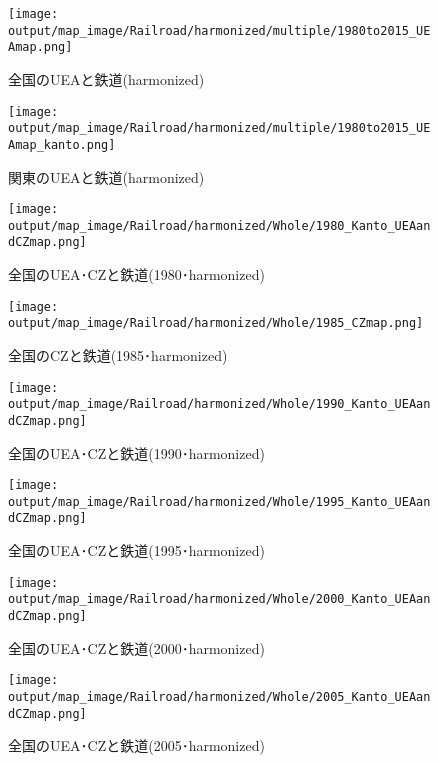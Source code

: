 \documentclass{ltjsarticle}
\begin{document}
\begin{figure}[pbth]
  \centering
  \texttt{[image: output/map\_image/Railroad/harmonized/multiple/1980to2015\_UEAmap.png]}
  \caption{\label{ham:allUEAandRail}全国のUEAと鉄道(harmonized)}
\end{figure}


\begin{figure}[pbth]
  \centering
  \texttt{[image: output/map\_image/Railroad/harmonized/multiple/1980to2015\_UEAmap\_kanto.png]}
  \caption{\label{ham:KanUEAandRail}関東のUEAと鉄道(harmonized)}
\end{figure}


\begin{figure}[pbth]
  \centering
  \texttt{[image: output/map\_image/Railroad/harmonized/Whole/1980\_Kanto\_UEAandCZmap.png]}
  \caption{\label{ham:1980:allCZandUEA:Rail}全国のUEA･CZと鉄道(1980･harmonized)}
\end{figure}


\begin{figure}[pbth]
  \centering
  \texttt{[image: output/map\_image/Railroad/harmonized/Whole/1985\_CZmap.png]}
  \caption{\label{ham:1985:allCZandUEA:Rail}全国のCZと鉄道(1985･harmonized)}
\end{figure}


\begin{figure}[pbth]
  \centering
  \texttt{[image: output/map\_image/Railroad/harmonized/Whole/1990\_Kanto\_UEAandCZmap.png]}
  \caption{\label{ham:1990:allCZandUEA:Rail}全国のUEA･CZと鉄道(1990･harmonized)}
\end{figure}


\begin{figure}[pbth]
  \centering
  \texttt{[image: output/map\_image/Railroad/harmonized/Whole/1995\_Kanto\_UEAandCZmap.png]}
  \caption{\label{ham:1995:allCZandUEA:Rail}全国のUEA･CZと鉄道(1995･harmonized)}
\end{figure}


\begin{figure}[pbth]
  \centering
  \texttt{[image: output/map\_image/Railroad/harmonized/Whole/2000\_Kanto\_UEAandCZmap.png]}
  \caption{\label{ham:2000:allCZandUEA:Rail}全国のUEA･CZと鉄道(2000･harmonized)}
\end{figure}


\begin{figure}[pbth]
  \centering
  \texttt{[image: output/map\_image/Railroad/harmonized/Whole/2005\_Kanto\_UEAandCZmap.png]}
  \caption{\label{ham:2005:allCZandUEA:Rail}全国のUEA･CZと鉄道(2005･harmonized)}
\end{figure}
\end{document}
